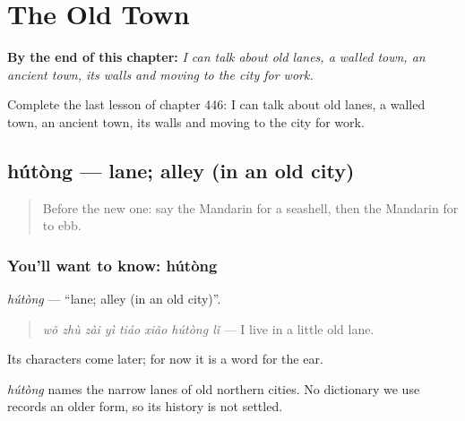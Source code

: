 
\chapter{The Old Town}
\label{ch:zh-the-old-town}

\begin{chapteropening}
\textbf{By the end of this chapter:} \emph{I can talk about old lanes, a walled town, an ancient town, its walls and moving to the city for work.}

Complete the last lesson of chapter 446: I can talk about old lanes, a walled town, an ancient town, its walls and moving to the city for work.
\end{chapteropening}

\section[hútòng]{hútòng — lane; alley (in an old city)}

\label{lesson:ZH-C446-hutong}



\begin{quote}
Before the new one: say the Mandarin for a seashell, then the Mandarin for to ebb.
\end{quote}

\subsection*{You'll want to know: hútòng}
\emph{hútòng} — \textquotedblleft{}lane; alley (in an old city)\textquotedblright{}.

\begin{quote}
\emph{wǒ zhù zài yì tiáo xiǎo hútòng lǐ} — I live in a little old lane.
\end{quote}

Its characters come later; for now it is a word for the ear.

\begin{cousinweb}
\emph{hútòng} names the narrow lanes of old northern cities. No dictionary we use records an older form, so its history is not settled.
\end{cousinweb}

